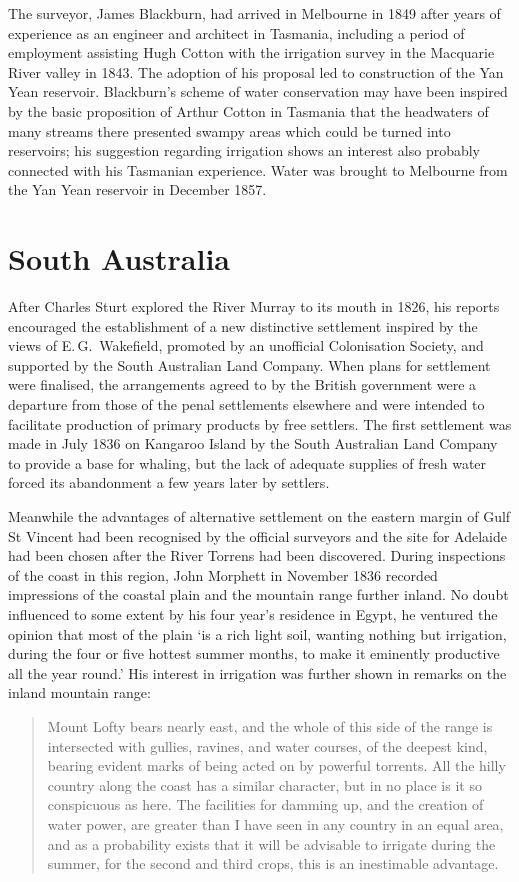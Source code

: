 The surveyor, James Blackburn, had arrived in Melbourne in 1849 after
years of experience as an engineer and architect in Tasmania,
including a period of employment assisting Hugh Cotton with the
irrigation survey in the Macquarie River valley in 1843.  The adoption
of his proposal led to construction of the Yan Yean reservoir.
Blackburn's scheme of water conservation may have been inspired by the
basic proposition of Arthur Cotton in Tasmania that the headwaters of
many streams there presented swampy areas which could be turned into
reservoirs; his suggestion regarding irrigation shows an interest also
probably connected with his Tasmanian experience.  Water was brought
to Melbourne from the Yan Yean reservoir in December 1857.

\section*{South Australia}

After Charles Sturt explored the River Murray to its mouth in 1826,
his reports encouraged the establishment of a new distinctive
settlement inspired by the views of E.\,G.~Wakefield, promoted by an
unofficial Colonisation Society, and supported by the South Australian
Land Company.  When plans for settlement were finalised, the
arrangements agreed to by the British government were a departure from
those of the penal settlements elsewhere and were intended to
facilitate production of primary products by free settlers.  The first
settlement was made in July 1836 on Kangaroo Island by the South
Australian Land Company to provide a base for whaling, but the lack of
adequate supplies of fresh water forced its abandonment a few years
later by settlers.

Meanwhile the advantages of alternative settlement on the eastern
margin of Gulf St Vincent had been recognised by the official
surveyors and the site for Adelaide had been chosen after the River
Torrens had been discovered.  During inspections of the coast in this
region, John Morphett in November 1836 recorded impressions of the
coastal plain and the mountain range further inland.  No doubt
influenced to some extent by his four year's residence in Egypt, he
ventured the opinion that most of the plain `is a rich light soil,
wanting nothing but irrigation, during the four or five hottest summer
months, to make it eminently productive all the year round.'  His
interest in irrigation was further shown in remarks on the inland
mountain range:
\begin{quote}
	Mount Lofty bears nearly east, and the whole of this side of
	the range is intersected with gullies, ravines, and water
	courses, of the deepest kind, bearing evident marks of being
	acted on by powerful torrents.  All the hilly country along
	the coast has a similar character, but in no place is it so
	conspicuous as here.  The facilities for damming up, and the
	creation of water power, are greater than I have seen in any
	country in an equal area, and as a probability exists that it
	will be advisable to irrigate during the summer, for the
	second and third crops, this is an inestimable
	advantage.
\end{quote}

